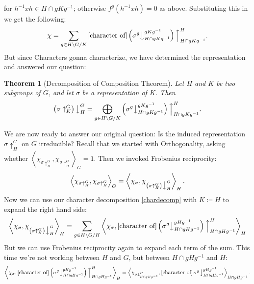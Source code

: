 \documentclass[12pt]{article}
\newcommand\inv[1]{#1^{-1}}
\newcommand\paren[1]{\left( #1 \right)}
\newcommand{\vbrack}[1]{\left \langle #1 \right \rangle}
\newtheorem{theorem}{Theorem}[section]
\theoremstyle{definition}
\begin{document}
for $\inv{h}xh \in  H \cap gK\inv{g}$; otherwise $f^g \paren{\inv{h}xh} = 0$ as above. Substituting this in we get the following:
\begin{equation}\label{chardecomp}
    \chi = \sum\limits_{g \in H \backslash G / K} \left[ \text{character of} \right] \paren{ \sigma^g \big\downarrow_{H \cap g K \inv{g}}^{g K \inv{g}} } \Big\uparrow_{H \cap gK \inv{g}}^H.
\end{equation}
But since Characters gonna characterize, we have determined the representation and answered our question:
\begin{theorem}[Decomposition of Composition Theorem]
    Let $H$ and $K$ be two subgroups of $G$, and let $\sigma$ be a representation of $K$. Then 
    \begin{equation}
        \paren{ \sigma \uparrow_K^G } \big\downarrow^G_H = \bigoplus_{g \in H \backslash G / K} \paren{ \sigma^g \big\downarrow_{H \cap g K \inv{g}}^{g K \inv{g}} } \Big\uparrow_{H \cap gK \inv{g}}^H.
    \end{equation}
\end{theorem}
We are now ready to answer our original question: Is the induced representation $\sigma\uparrow_H^G$ on $G$ irreducible? Recall that we started with Orthogonality, asking whether $\vbrack{ \chi_{\sigma\uparrow_H^G} , \chi_{\sigma\uparrow_H^G} }_G = 1$. Then we invoked Frobenius reciprocity: 
\begin{equation}
    \vbrack{ \chi_{\sigma\uparrow_H^G} , \chi_{\sigma\uparrow_H^G} }_G = \vbrack{ \chi_{\sigma} , \chi_{ \paren{ \sigma\uparrow_H^G} \big\downarrow^G_H } }_H.
\end{equation}
Now we can use our character decomposition \eqref{chardecomp} with $K \coloneqq  H$ to expand the right hand side:
\begin{equation}
    \vbrack{ \chi_{\sigma} , \chi_{ \paren{ \sigma\uparrow_H^G} \big\downarrow^G_H } }_H = \sum\limits_{g \in H \backslash G / H} \vbrack{ \chi_{\sigma} , \left[ \text{character of} \right]  \paren{ \sigma^g \big\downarrow_{H \cap g H \inv{g}}^{g H \inv{g}} } \Big\uparrow_{H \cap gH \inv{g}}^H }_H
\end{equation}
But we can use Frobenius reciprocity again to expand each term of the sum. This time we're not working between $H$ and $G$, but between $H \cap g H \inv{g}$ and $H$:
\begin{equation}
    \vbrack{ \chi_{\sigma} , \left[ \text{character of} \right]  \paren{ \sigma^g \big\downarrow_{H \cap g H \inv{g}}^{g H \inv{g}} } \Big\uparrow_{H \cap gH \inv{g}}^H }_H = \vbrack{ \chi_{\sigma \downarrow^H_{H \cap g H \inv{g}} } , \left[ \text{character of} \right] \sigma^g \big\downarrow^{g H \inv{g}}_{H \cap g H \inv{g}} }_{H \cap g H \inv{g}}.
\end{equation}
\end{document}
